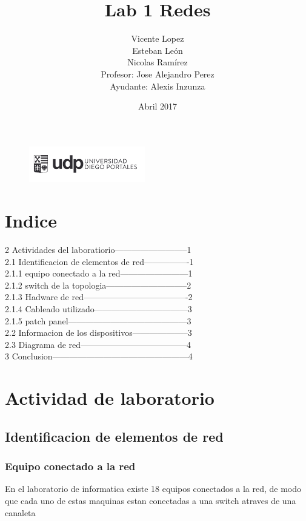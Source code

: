 \documentclass{article}
\title{Lab 1 Redes}
\author{Vicente Lopez\\Esteban León\\Nicolas Ramírez\\Profesor: Jose Alejandro Perez\\Ayudante: Alexis Inzunza}
\date{Abril 2017}
\begin{document}
\begin{figure}[h]
\includegraphics[width=0.45\textwidth]{logo_udp.png}
\maketitle
\end{figure}

\section{Indice}
2 Actividades del laboratiorio--------------------------1\\
2.1 Identificacion de elementos de red----------------1\\
2.1.1 equipo conectado a la red------------------------1\\
2.1.2 switch de la topologia-----------------------------2\\
2.1.3 Hadware de red-------------------------------------2\\
2.1.4 Cableado utilizado---------------------------------3\\
2.1.5 patch panel------------------------------------------3\\
2.2 Informacion de los dispositivos--------------------3\\
2.3 Diagrama de red--------------------------------------4\\
3 Conclusion------------------------------------------------4\\
\section{Actividad de laboratorio}
\subsection{Identificacion de elementos de red}
\subsubsection{Equipo conectado a la red}
En el laboratorio de informatica existe 18 equipos conectados a la red, de modo que cada uno de estas maquinas estan conectadas a una switch atraves de una canaleta \\
\end{document}
